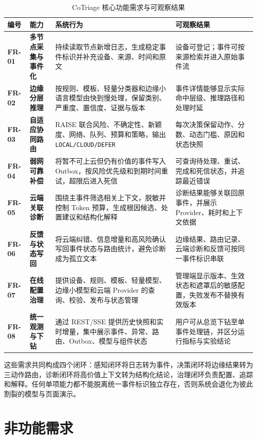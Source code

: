 \begin{table}[htbp]
  \centering
  \footnotesize
  \caption{CoTriage 核心功能需求与可观察结果}
  \label{tab:functional-requirements}
  \begin{tabularx}{\textwidth}{>{\bfseries\ttfamily}p{} >{\bfseries}p{} X p{}}
    \toprule
    \normalfont 编号 & 能力 & 系统行为 & 可观察结果 \\
    \midrule
    FR-01 & 多节点采集与事件化 & 持续读取节点新增日志，生成稳定事件标识并补充设备、来源、时间和原文 & 设备可登记；事件可按来源检索并进入原始事件流 \\
    FR-02 & 边缘分层推理 & 按规则、模板、轻量分类器和边缘小语言模型由快到慢处理，保留类别、严重度、置信度、证据与版本 & 事件详情能够显示实际命中层级、推理路径和处理时延 \\
    FR-03 & 自适应协同路由 & RAISE 联合风险、不确定性、新颖度、网络、队列、预算和策略，输出 \texttt{LOCAL/CLOUD/DEFER} & 每次决策保留动作、分数、动态门槛、原因和状态快照 \\
    FR-04 & 弱网可靠补偿 & 将暂不可上云但仍有价值的事件写入 Outbox，按风险优先级和到期时间重试，超限后进入死信 & 可查询待处理、重试、完成和死信状态，并追踪最近错误 \\
    FR-05 & 云端关联诊断 & 围绕主事件筛选相关上下文，脱敏并控制 Token 预算，生成根因候选、处置建议和结构化解释 & 诊断结果能够关联回原事件，并展示 Provider、耗时和上下文依据 \\
    FR-06 & 反馈与状态写回 & 将云端纠错、信息增量和高风险确认写回事件状态与路由统计，避免诊断成为孤立文本 & 边缘结果、路由记录、云端诊断和反馈可按同一事件标识串联 \\
    FR-07 & 在线配置治理 & 提供设备、规则、模板、轻量模型、边缘小模型和云端 Provider 的查询、校验、发布与状态管理 & 管理端显示版本、生效状态和遮罩后的敏感配置，失败发布不替换有效版本 \\
    FR-08 & 统一观测与下钻 & 通过 REST/SSE 提供历史快照和实时增量，集中展示事件、异常、路由、Outbox、模型与组件状态 & 用户可从总览下钻至单事件处理链，并区分运行指标与实验结论 \\
    \bottomrule
  \end{tabularx}
\end{table}

这些需求共同构成四个闭环：感知闭环将日志转为事件，决策闭环将边缘结果转为三动作路由，诊断闭环将高价值上下文转为结构化结论，治理闭环负责配置、追踪和解释。任何单项能力都不能脱离统一事件标识独立存在，否则系统会退化为彼此割裂的模型与页面演示。

\section{非功能需求}

